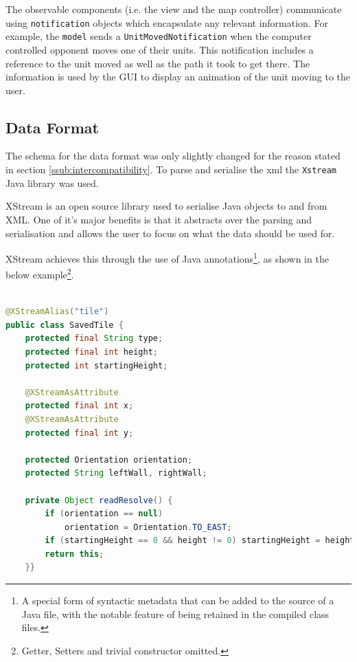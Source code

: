 

The observable components (i.e. the view and the map controller) communicate using \texttt{notification} objects which encapsulate any relevant information. For example, the \texttt{model} sends a \texttt{UnitMovedNotification} when the computer controlled opponent moves one of their units. This notification includes a reference to the unit moved as well as the path it took to get there. The information is used by the GUI to display an animation of the unit moving to the user.

\clearpage
\subsection{Data Format}
\label{sub:data_format}

The schema for the data format was only slightly changed for the reason stated in section \ref{ssub:intercompatibility}. To parse and serialise the xml the \texttt{Xstream} Java library was used.
 
XStream is an open source library used to serialise Java objects to and from XML. One of it's major benefits is that it abstracts over the parsing and serialisation and allows the user to focus on what the data should be used for. 

XStream achieves this through the use of Java annotations\footnote{A special form of syntactic metadata that can be added to the source of a Java file, with the notable feature of being retained in the compiled class files.}, as shown in the below example\footnote{Getter, Setters and trivial constructor omitted.}.

\begin{lstlisting}[caption=Example of class that is serialisable with XStream, label=lst:SavedTile, language=java] %Java
	
@XStreamAlias("tile")
public class SavedTile {
	protected final String type;
	protected final int height; 
	protected int startingHeight;
	
	@XStreamAsAttribute
	protected final int x;
	@XStreamAsAttribute
	protected final int y;

	protected Orientation orientation;
	protected String leftWall, rightWall;
	
	private Object readResolve() {
		if (orientation == null)  
			orientation = Orientation.TO_EAST;
		if (startingHeight == 0 && height != 0) startingHeight = height;
		return this;
	}}
\end{lstlisting}

